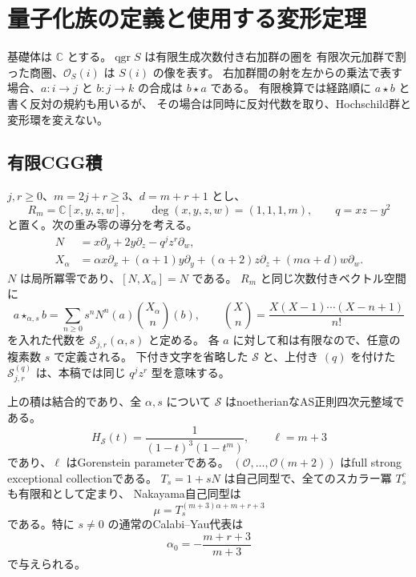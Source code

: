 \section{量子化族の定義と使用する変形定理}
\label{sec:quantum-setup-v35}

基礎体は $\mathbb C$ とする。$\operatorname{qgr}S$ は有限生成次数付き右加群の圏を
有限次元加群で割った商圏、$\mathcal O_S(i)$ は $S(i)$ の像を表す。
右加群間の射を左からの乗法で表す場合、$a:i\to j$ と $b:j\to k$ の合成は $b\star a$ である。
有限検算では経路順に $a\star b$ と書く反対の規約も用いるが、
その場合は同時に反対代数を取り、Hochschild群と変形環を変えない。

\subsection{有限CGG積}

$j,r\ge0$、$m=2j+r\ge3$、$d=m+r+1$ とし、
\[
 R_m=\mathbb C[x,y,z,w],\qquad
 \deg(x,y,z,w)=(1,1,1,m),\qquad q=xz-y^2
\]
と置く。次の重み零の導分を考える。
\begin{align*}
 N&=x\partial_y+2y\partial_z-q^jz^r\partial_w,\\
 X_\alpha&=\alpha x\partial_x+(\alpha+1)y\partial_y+(\alpha+2)z\partial_z
                      +(m\alpha+d)w\partial_w.
\end{align*}
$N$ は局所冪零であり、$[N,X_\alpha]=N$ である。
$R_m$ と同じ次数付きベクトル空間に
\begin{equation}
 a\star_{\alpha,s}b
  =\sum_{n\ge0}s^nN^n(a)\binom{X_\alpha}{n}(b),\qquad
 \binom{X}{n}=\frac{X(X-1)\cdots(X-n+1)}{n!}
 \label{eq:CGG-product-v35}
\end{equation}
を入れた代数を $\mathcal S_{j,r}(\alpha,s)$ と定める。
各 $a$ に対して和は有限なので、任意の複素数 $s$ で定義される。
下付き文字を省略した $\mathcal S$ と、上付き $(q)$ を付けた
$\mathcal S_{j,r}^{(q)}$ は、本稿では同じ $q^jz^r$ 型を意味する。

\begin{proposition}[量子化族の基本性質]
\label{prop:CGG-input-v35}
上の積は結合的であり、全 $\alpha,s$ について
$\mathcal S$ はnoetherianなAS正則四次元整域である。
\[
 H_{\mathcal S}(t)=\frac1{(1-t)^3(1-t^m)},\qquad \ell=m+3
\]
であり、$\ell$ はGorenstein parameterである。
$(\mathcal O,\ldots,\mathcal O(m+2))$ はfull strong exceptional collectionである。
$T_s=1+sN$ は自己同型で、全てのスカラー冪 $T_s^c$ も有限和として定まり、
Nakayama自己同型は
\[
 \mu=T_s^{(m+3)\alpha+m+r+3}
\]
である。特に $s\ne0$ の通常のCalabi--Yau代表は
\[
 \alpha_0=-\frac{m+r+3}{m+3}
\]
で与えられる。
\end{proposition}

